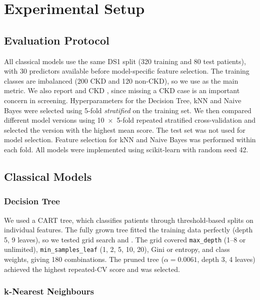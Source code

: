 \section{Experimental Setup}

\subsection{Evaluation Protocol}

All classical models use the same DS1 split (320 training and 80 test patients), with 30 predictors available before model-specific feature selection. The training classes are imbalanced (200 CKD and 120 non-CKD), so we use  as the main metric. We also report  and CKD , since missing a CKD case is an important concern in screening. Hyperparameters for the Decision Tree, kNN and Naive Bayes were selected using 5-fold \emph{stratified}  on the training set. We then compared different model versions using 10~$\times$~5-fold repeated stratified cross-validation and selected the version with the highest mean score. The test set was not used for model selection. Feature selection for kNN and Naive Bayes was performed within each fold. All models were implemented using scikit-learn\cite{pedregosa2011} with random seed 42.

\subsection{Classical Models}

\subsubsection{Decision Tree}\label{sec:dt}

We used a CART tree,\cite{breiman1984} which classifies patients through threshold-based splits on individual features. The fully grown tree fitted the training data perfectly (depth 5, 9 leaves), so we tested grid search and . The grid covered \texttt{max\_depth} (1--8 or unlimited), \texttt{min\_samples\_leaf} (1, 2, 5, 10, 20), Gini or entropy\cite{quinlan1986}, and class weights, giving 180 combinations. The pruned tree ($\alpha = 0.0061$, depth 3, 4 leaves) achieved the highest repeated-CV score and was selected.

\subsubsection{k-Nearest Neighbours}\label{sec:knn}

